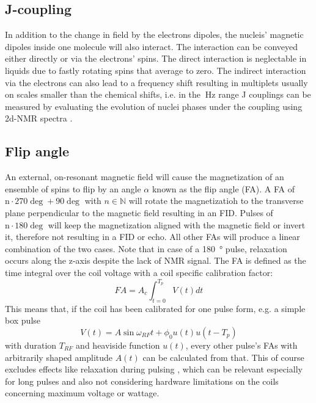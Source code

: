         \subsection{J-coupling}
        In addition to the change in field by the electrons dipoles, the nucleis' magnetic dipoles inside one molecule will also interact. The interaction can be conveyed either directly or via the electrons' spins. The direct interaction is neglectable in liquids due to fastly rotating spins that average to zero. The indirect interaction via the electrons can also lead to a frequency shift resulting in multiplets usually on scales smaller than the chemical shifts, i.e. in the $\SI{}{\hertz}$ range 
        J couplings can be measured by evaluating the evolution of nuclei phases under the coupling using 2d-NMR spectra \cite{ottiger_measurement_1998}.
        \subsection{Flip angle}
            An external, on-resonant magnetic field will cause the magnetization of an ensemble of spins to flip by an angle $\alpha$ known as the flip angle (FA). A FA of $\mathrm n\cdot 270 \deg + 90 \deg$ with $n \in \mathbb{N}$ will rotate the magnetizatioh to the transverse plane perpendicular to the magnetic field resulting in an FID. Pulses of $\mathrm n\cdot 180 \deg$ will keep the magnetization aligned with the magnetic field or invert it, therefore not resulting in a FID or echo. All other FAs will produce a linear combination of the two cases. Note that in case of a \SI{180}{\degree} pulse, relaxation occurs along the z-axis despite the lack of NMR signal. The FA is defined as the time integral over the coil voltage with a coil specific calibration factor:
            \begin{equation}
                FA = A_c \int_{t=0}^{T_p}{V(t)dt}
            \end{equation}
            This means that, if the coil has been calibrated for one pulse form, e.g. a simple box pulse 
            \begin{equation}
                V(t) = A\sin{\omega_{RF} t + \phi_0} u(t)u(t-T_p)
            \end{equation}
            with duration $T_{RF}$ and heaviside function $u(t)$, every other pulse's FAs with arbitrarily shaped amplitude $A(t)$ can be calculated from that. This of course excludes effects like relaxation during pulsing \cite{wang_factors_2006}, which can be relevant especially for long pulses and also not considering hardware limitations on the coils concerning maximum voltage or wattage.
